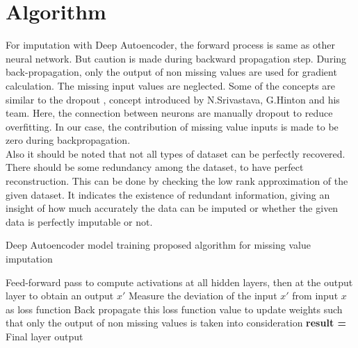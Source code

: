 \section{Algorithm}
For imputation with Deep Autoencoder, the forward process is same as other neural network. But caution is made during backward propagation step. During back-propagation, only the output of non missing values are used for gradient calculation. The missing input values are neglected. Some of the concepts are similar to the dropout \cite{hinton_dropout}, concept introduced by N.Srivastava, G.Hinton and his team. Here, the connection between neurons are manually dropout to reduce overfitting. In our case, the contribution of missing value inputs is made to be zero during backpropagation.
\\ Also it should be noted that not all types of dataset can be perfectly recovered. There should be some redundancy among the dataset, to have perfect reconstruction. This can be done by checking the low rank approximation of the given dataset. It indicates the existence of redundant information, giving an insight of how much accurately the data can be imputed or whether the given data is perfectly imputable or not. \cite{shabat_matrix_completion}

\begin{algorithm}
  \caption{Deep Autoencoder model training proposed algorithm for missing value imputation}\label{algorithm}
  \begin{algorithmic}[1]
        \State Feed-forward pass to compute 		activations at all hidden layers, then at the output 		layer to obtain an output $x'$ 
        \State Measure the deviation of  the input         $x'$ from input $x$ as loss function
        \State Back propagate this loss function value to update weights such that only the output of non missing values is taken into consideration 
      \EndFor
      \State \textbf{result = }   Final layer output 
  \end{algorithmic}
\end{algorithm}

